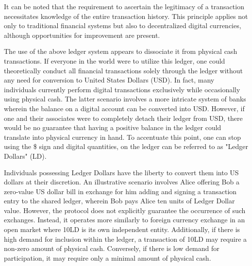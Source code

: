 It can be noted that the requirement to ascertain the legitimacy of a transaction necessitates knowledge of the entire transaction history. This principle applies not only to traditional financial systems but also to decentralized digital currencies, although opportunities for improvement are present.

%

The use of the above ledger system appears to dissociate it from physical cash transactions. If everyone in the world were to utilize this ledger, one could theoretically conduct all financial transactions solely through the ledger without any need for conversion to United States Dollars (USD). In fact, many individuals currently perform digital transactions exclusively while occasionally using physical cash. The latter scenario involves a more intricate system of banks wherein the balance on a digital account can be converted into USD. However, if one and their associates were to completely detach their ledger from USD, there would be no guarantee that having a positive balance in the ledger could translate into physical currency in hand. To accentuate this point, one can stop using the \$ sign and digital quantities, on the ledger can be referred to as "Ledger Dollars" (LD).

Individuals possessing Ledger Dollars have the liberty to convert them into US dollars at their discretion. An illustrative scenario involves Alice offering Bob a zero-value US dollar bill in exchange for him adding and signing a transaction entry to the shared ledger, wherein Bob pays Alice ten units of Ledger Dollar value. However, the protocol does not explicitly guarantee the occurrence of such exchanges. Instead, it operates more similarly to foreign currency exchange in an open market where 10LD is its own independent entity. Additionally, if there is high demand for inclusion within the ledger, a transaction of 10LD may require a non-zero amount of physical cash. Conversely, if there is low demand for participation, it may require only a minimal amount of physical cash.

%


